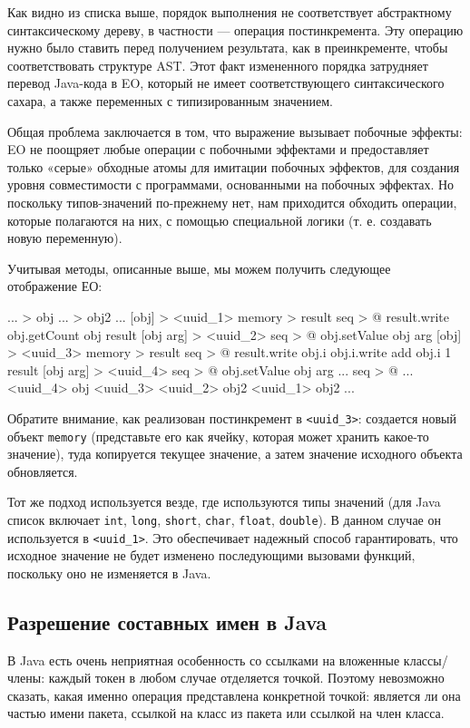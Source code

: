 \documentclass[oneside,final,14pt,a4paper]{extreport}
\theoremstyle{definition}
\theoremstyle{remark}
\theoremstyle{remark}
\begin{document}
Как видно из списка выше, порядок выполнения не соответствует абстрактному синтаксическому дереву, в частности --- операция постинкремента. Эту операцию нужно было ставить перед получением результата, как в преинкременте, чтобы соответствовать структуре AST. Этот факт измененного порядка затрудняет перевод Java-кода в EO, который не имеет соответствующего синтаксического сахара, а также переменных с типизированным значением.

Общая проблема заключается в том, что выражение вызывает побочные эффекты: EO не поощряет любые операции с побочными эффектами и предоставляет только «серые» обходные атомы для имитации побочных эффектов, для создания уровня совместимости с программами, основанными на побочных эффектах. Но поскольку типов-значений по-прежнему нет, нам приходится обходить операции, которые полагаются на них, с помощью специальной логики (т. е. создавать новую переменную).

Учитывая методы, описанные выше, мы можем получить следующее отображение ЕО:

\begin{ffcode}
... > obj
... > obj2
...
[obj] > <uuid_1>
  memory > result
  seq > @
    result.write
      obj.getCount obj
    result
[obj arg] > <uuid_2>
  seq > @
    obj.setValue obj arg
[obj] > <uuid_3>
  memory > result
  seq > @
    result.write
      obj.i
    obj.i.write
      add
        obj.i
        1
    result
[obj arg] > <uuid_4>
  seq > @
    obj.setValue
      obj
      arg
...
seq > @
  ...
  <uuid_4>
    obj
    <uuid_3>
      <uuid_2>
        obj2
        <uuid_1>
          obj2
  ...
\end{ffcode}


Обратите внимание, как реализован постинкремент в \texttt{<uuid\_3>}: создается новый объект \texttt{memory} (представьте его как ячейку, которая может хранить какое-то значение), туда копируется текущее значение, а затем значение исходного объекта обновляется.

Тот же подход используется везде, где используются типы значений (для Java список включает \texttt{int}, \texttt{long}, \texttt{short}, \texttt{char}, \texttt{float}, \texttt{double}). В данном случае он используется в \texttt{<uuid\_1>}. Это обеспечивает надежный способ гарантировать, что исходное значение не будет изменено последующими вызовами функций, поскольку оно не изменяется в Java.

\subsection{Разрешение составных имен в Java}
В Java есть очень неприятная особенность со ссылками на вложенные классы/члены: каждый токен в любом случае отделяется точкой. Поэтому невозможно сказать, какая именно операция представлена ​​конкретной точкой: является ли она частью имени пакета, ссылкой на класс из пакета или ссылкой на член класса.
\end{document}
